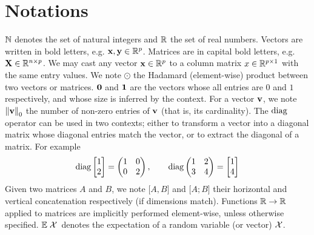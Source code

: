 \cleardoublepage
\chapter*{Notations}

$\mathbb{N}$ denotes the set of natural integers and $\mathbb{R}$ the set of real numbers.
%
Vectors are written in bold letters, e.g. $\mathbf{x}, \mathbf{y} \in \mathbb{R}^p$.
%
Matrices are in capital bold letters, e.g. $\mathbf{X} \in \mathbb{R}^{n \times p}$.
%
We may cast any vector $\mathbf{x} \in \mathbb{R}^p$ to a column matrix $x \in \mathbb{R}^{p \times 1}$ with the same entry values.
%
We note $\odot$ the Hadamard (element-wise) product between two vectors or matrices.
%
$\mathbf{0}$ and $\mathbf{1}$ are the vectors whose all entries are $0$ and $1$ respectively, and whose size is inferred by the context.
%
For a vector $\mathbf{v}$, we note $\left\lVert\mathbf{v}\right\rVert_0$ the number of non-zero entries of $\mathbf{v}$ (that is, its cardinality).
%
The $\operatorname*{diag}$ operator can be used in two contexts;
either to transform a vector into a diagonal matrix whose diagonal entries match the vector,
or to extract the diagonal of a matrix.
For example
\begin{equation*}
    \diag \begin{bmatrix}
         1\\
         2
    \end{bmatrix}
    =
    \left(\begin{array}{@{}cc@{}}
        1 & 0\\
        0 & 2
    \end{array}\right)
    ,\qquad
    \diag \left(\begin{array}{@{}cc@{}}
        1 & 2\\
        3 & 4
    \end{array}\right)
    =
    \begin{bmatrix}
         1\\
         4
    \end{bmatrix}
\end{equation*}
%
Given two matrices $A$ and $B$, we note $\big[ A, B \big]$ and $\big[ A; B \big]$ their horizontal and
vertical concatenation respectively (if dimensions match).
%
Functions $\mathbb{R} \to \mathbb{R}$ applied to matrices are implicitly performed element-wise, unless otherwise specified.
%
${\mathbb E}\left.\mathcal{X}\right.$ denotes the expectation of a random variable (or vector) $\mathcal{X}$.
